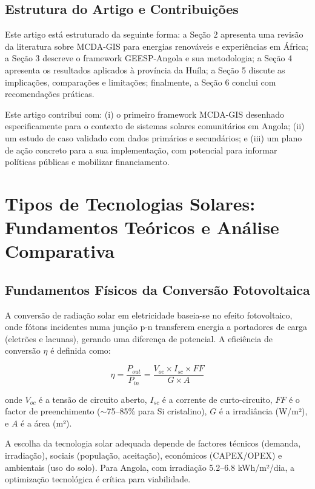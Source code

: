 \documentclass[12pt, a4paper]{article}
\begin{document}
\subsection{Estrutura do Artigo e Contribuições}
Este artigo está estruturado da seguinte forma: a Seção 2 apresenta uma revisão da literatura sobre MCDA-GIS para energias renováveis e experiências em África; a Seção 3 descreve o framework GEESP-Angola e sua metodologia; a Seção 4 apresenta os resultados aplicados à província da Huíla; a Seção 5 discute as implicações, comparações e limitações; finalmente, a Seção 6 conclui com recomendações práticas.

Este artigo contribui com: (i) o primeiro framework MCDA-GIS desenhado especificamente para o contexto de sistemas solares comunitários em Angola; (ii) um estudo de caso validado com dados primários e secundários; e (iii) um plano de ação concreto para a sua implementação, com potencial para informar políticas públicas e mobilizar financiamento.



\section{Tipos de Tecnologias Solares: Fundamentos Teóricos e Análise Comparativa}

\subsection{Fundamentos Físicos da Conversão Fotovoltaica}

A conversão de radiação solar em eletricidade baseia-se no efeito fotovoltaico, onde fótons incidentes numa junção p-n transferem energia a portadores de carga (eletrões e lacunas), gerando uma diferença de potencial. A eficiência de conversão $\eta$ é definida como:

\begin{equation}
\eta = \frac{P_{out}}{P_{in}} = \frac{V_{oc} \times I_{sc} \times FF}{G \times A}
\end{equation}

onde $V_{oc}$ é a tensão de circuito aberto, $I_{sc}$ é a corrente de curto-circuito, $FF$ é o factor de preenchimento ($\sim$75--85\% para Si cristalino), $G$ é a irradiância (W/m²), e $A$ é a área (m²).

A escolha da tecnologia solar adequada depende de factores técnicos (demanda, irradiação), sociais (população, aceitação), económicos (CAPEX/OPEX) e ambientais (uso do solo). Para Angola, com irradiação 5.2--6.8 kWh/m²/dia, a optimização tecnológica é crítica para viabilidade.
\end{document}
